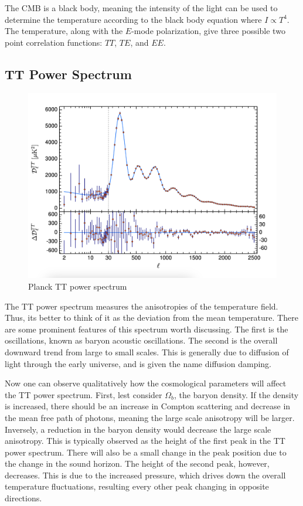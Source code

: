 The CMB is a black body, meaning the intensity of the light can be used to determine the temperature according to the black body equation where $I \propto T^4$. The temperature, along with the $E$-mode polarization, give three possible two point correlation functions: $TT$, $TE$, and $EE$.
\subsection{TT Power Spectrum}
\begin{figure}
    \centering
    \includegraphics[width=12cm]{plots/Planck_TT.png}
    \caption{Planck TT power spectrum}
    \label{fig:planck_tt}
\end{figure}
The TT power spectrum measures the anisotropies of the temperature field. Thus, its better to think of it as the deviation from the mean temperature. There are some prominent features of this spectrum worth discussing. The first is the oscillations, known as baryon acoustic oscillations. The second is the overall downward trend from large to small scales. This is generally due to diffusion of light through the early universe, and is given the name diffusion damping.

Now one can observe qualitatively how the cosmological parameters will affect the TT power spectrum. First, lest consider $\Omega_b$, the baryon density. If the density is increased, there should be an increase in Compton scattering and decrease in the mean free path of photons, meaning the large scale anisotropy will be larger. Inversely, a reduction in the baryon density would decrease the large scale anisotropy. This is typically observed as the height of the first peak in the TT power spectrum. There will also be a small change in the peak position due to the change in the sound horizon. The height of the second peak, however, decreases. This is due to the increased pressure, which drives down the overall temperature fluctuations, resulting every other peak changing in opposite directions.

